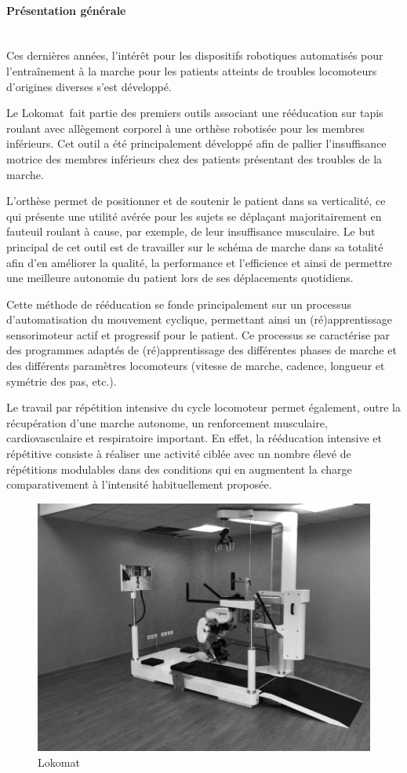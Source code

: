 

\paragraph{Présentation générale} ~\ \\

Ces dernières années, l'intérêt pour les dispositifs robotiques automatisés pour l'entraînement à la marche pour les patients atteints de troubles locomoteurs d'origines diverses s'est développé.

Le Lokomat\textregistered\ fait partie des premiers outils associant une rééducation sur tapis roulant avec allègement corporel à une orthèse robotisée pour les membres inférieurs. Cet outil a été principalement développé afin de pallier l'insuffisance motrice des membres inférieurs chez des patients présentant des troubles de la marche.

L'orthèse permet de positionner et de soutenir le patient dans sa verticalité, ce qui présente une utilité avérée pour les sujets se déplaçant majoritairement en fauteuil roulant à cause, par exemple, de leur insuffisance musculaire. Le but principal de cet outil est de travailler sur le schéma de marche dans sa totalité afin d'en améliorer la qualité, la performance et l'efficience et ainsi de permettre une meilleure autonomie du patient lors de ses déplacements quotidiens.

Cette méthode de rééducation se fonde principalement sur un processus d'automatisation du mouvement cyclique, permettant ainsi un (ré)apprentissage sensorimoteur actif et progressif pour le patient. Ce processus se caractérise par des programmes adaptés de (ré)apprentissage des différentes phases de marche et des différents paramètres locomoteurs (vitesse de marche, cadence, longueur et symétrie des pas, etc.).

Le travail par répétition intensive du cycle locomoteur permet également, outre la récupération d'une marche autonome, un renforcement musculaire, cardiovasculaire et respiratoire important. En effet, la rééducation intensive et répétitive consiste à réaliser une activité ciblée avec un nombre élevé de répétitions modulables dans des conditions qui en augmentent la charge comparativement à l'intensité habituellement proposée.

\begin{figure}[ht!]
\begin{center}
 \includegraphics[width=0.55\linewidth]{img/fig01}
\end{center}
\caption{\label{fig01} Lokomat\textregistered }
\end{figure}

